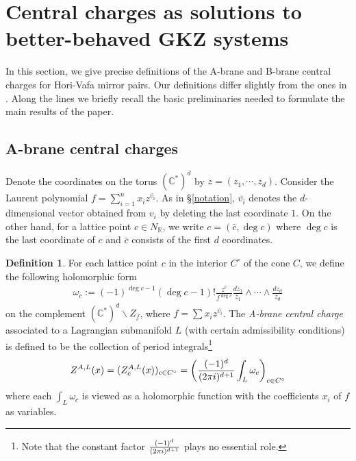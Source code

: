 \documentclass[11pt,reqno]{amsart}
\def\C {{\mathbb C}}
\def\CC {{\mathbb C}}
\def\R {{\mathbb R}}
\theoremstyle{definition}
\newtheorem{definition}[theorem]{Definition}
\numberwithin{equation}{section}
\begin{document}
\section{Central charges as solutions to better-behaved GKZ systems}\label{central charges}

In this section, we give precise definitions of the A-brane and B-brane central charges for Hori-Vafa mirror pairs. Our definitions differ slightly from the ones in \cite{Hosono}. Along the lines we briefly recall the basic preliminaries needed to formulate the main results of the paper.

\subsection{A-brane central charges}



Denote the coordinates on the torus $(\C^*)^d$ by $z=(z_1,\cdots,z_d)$. Consider the Laurent polynomial $f=\sum_{i=1}^n x_i z^{\bar{v_i}}$. As in \S\ref{notation}, $\bar{v_i}$ denotes the $d$-dimensional vector obtained from $v_i$ by deleting the last coordinate $1$. On the other hand, for a lattice point $c\in N_{\R}$, we write $c=(\bar{c},\deg c)$ where $\deg c$ is the last coordinate of $c$ and $\bar{c}$ consists of the first $d$ coordinates.

\smallskip


\begin{definition}\label{A-brane central charge}
	For each lattice point $c$ in the interior $C^{\circ}$ of the cone $C$, we define the following holomorphic form
	\begin{align*}
		\omega_c:=(-1)^{\deg c-1}(\deg c-1)!\frac{z^{\bar{c}}}{f^{\deg c}}\frac{dz_1}{z_1}\wedge\cdots\wedge\frac{dz_d}{z_d}
	\end{align*}
	on the complement $(\CC^*)^d\backslash Z_f$, where $f=\sum x_i z^{\bar{v_i}}$. The \textit{A-brane central charge} associated to a Lagrangian submanifold $L$ (with certain admissibility conditions) is defined to be the collection of period integrals\footnote{ Note that the constant factor $\frac{(-1)^d}{(2\pi{\rm i})^{d+1}}$ plays no essential role.}
	\begin{align*}
		Z^{A,L}(x)=(Z^{A,L}_c(x))_{c\in C^{\circ}}=\left(\frac{(-1)^d}{(2\pi{\rm i})^{d+1}}\int_{L}\omega_c\right)_{c\in C^{\circ}}
	\end{align*}
	where each $\int_{L}\omega_c$ is viewed as a holomorphic function with the coefficients $x_i$ of $f$ as variables.
\end{definition}
\end{document}
